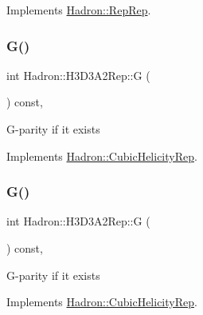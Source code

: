 Implements \mbox{\hyperlink{structHadron_1_1RepRep_a92c8802e5ed7afd7da43ccfd5b7cd92b}{Hadron\+::\+Rep\+Rep}}.

\mbox{\label{structHadron_1_1H3D3A2Rep_aae22d0d5ee1cbaa01ff3677e011105bc}} 
\subsubsection{\texorpdfstring{G()}{G()}\hspace{0.1cm}{\footnotesize\ttfamily [1/3]}}
{\footnotesize\ttfamily int Hadron\+::\+H3\+D3\+A2\+Rep\+::G (\begin{DoxyParamCaption}{ }\end{DoxyParamCaption}) const\hspace{0.3cm}{\ttfamily [inline]}, {\ttfamily [virtual]}}

G-\/parity if it exists 

Implements \mbox{\hyperlink{structHadron_1_1CubicHelicityRep_a50689f42be1e6170aa8cf6ad0597018b}{Hadron\+::\+Cubic\+Helicity\+Rep}}.

\mbox{\label{structHadron_1_1H3D3A2Rep_aae22d0d5ee1cbaa01ff3677e011105bc}} 
\subsubsection{\texorpdfstring{G()}{G()}\hspace{0.1cm}{\footnotesize\ttfamily [2/3]}}
{\footnotesize\ttfamily int Hadron\+::\+H3\+D3\+A2\+Rep\+::G (\begin{DoxyParamCaption}{ }\end{DoxyParamCaption}) const\hspace{0.3cm}{\ttfamily [inline]}, {\ttfamily [virtual]}}

G-\/parity if it exists 

Implements \mbox{\hyperlink{structHadron_1_1CubicHelicityRep_a50689f42be1e6170aa8cf6ad0597018b}{Hadron\+::\+Cubic\+Helicity\+Rep}}.

\mbox{\label{structHadron_1_1H3D3A2Rep_aae22d0d5ee1cbaa01ff3677e011105bc}} 
